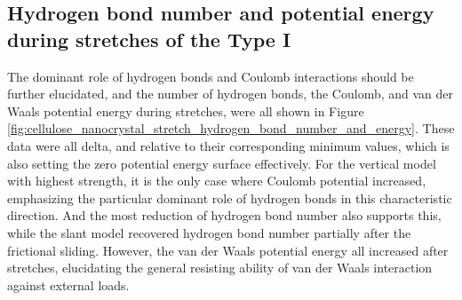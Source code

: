 \documentclass{article}
\begin{document}
\clearpage

\subsection*{Hydrogen bond number and potential energy during stretches of the Type I}\indent
{}\indent

The dominant role of hydrogen bonds and Coulomb interactions should be further elucidated, and the number of hydrogen bonds, the Coulomb, and van der Waals potential energy during stretches, were all shown in Figure \ref{fig:cellulose_nanocrystal_stretch_hydrogen_bond_number_and_energy}.
These data were all delta, and relative to their corresponding minimum values, which is also setting the zero potential energy surface effectively.
For the vertical model with highest strength, it is the only case where Coulomb potential increased, emphasizing the particular dominant role of hydrogen bonds in this characteristic direction.
And the most reduction of hydrogen bond number also supports this, while the slant model recovered hydrogen bond number partially after the frictional sliding.
However, the van der Waals potential energy all increased after stretches, elucidating the general resisting ability of van der Waals interaction against external loads.
\end{document}
